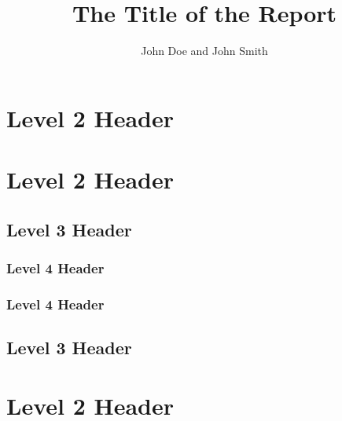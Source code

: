 \documentclass[workingpaper,nochapters]{aaltoseries}
\author{John Doe and John Smith}
\title{The Title of the Report}
\begin{document}
\tableofcontents

\section{Level 2 Header}

\lipsum[1-3]

\section{Level 2 Header}

\lipsum[4]

\subsection{Level 3 Header}

\lipsum[5-6]

\subsubsection{Level 4 Header}

\lipsum[7]

\subsubsection{Level 4 Header}

\lipsum[8]

\subsection{Level 3 Header}

\lipsum[9-10]

\section{Level 2 Header}

\lipsum[11-12]
\end{document}
